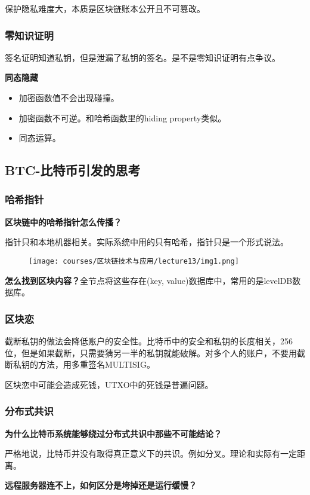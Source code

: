 \documentclass[10pt]{ctexart}
\begin{document}
保护隐私难度大，本质是区块链账本公开且不可篡改。

\subsubsection{零知识证明}
签名证明知道私钥，但是泄漏了私钥的签名。是不是零知识证明有点争议。

\textbf{同态隐藏}
\begin{itemize}
    \item 加密函数值不会出现碰撞。
    \item 加密函数不可逆。和哈希函数里的hiding property类似。
    \item 同态运算。
\end{itemize}
 
\subsection{BTC-比特币引发的思考}
\subsubsection{哈希指针}
\textbf{区块链中的哈希指针怎么传播？}

指针只和本地机器相关。实际系统中用的只有哈希，指针只是一个形式说法。
\begin{figure}[H]
    \centering
    \texttt{[image: courses/区块链技术与应用/lecture13/img1.png]} 
\end{figure}
 
\textbf{怎么找到区块内容？}全节点将这些存在(key, value)数据库中，常用的是levelDB数据库。

\subsubsection{区块恋}
截断私钥的做法会降低账户的安全性。比特币中的安全和私钥的长度相关，256位，但是如果截断，只需要猜另一半的私钥就能破解。对多个人的账户，不要用截断私钥的方法，用多重签名MULTISIG。

区块恋中可能会造成死钱，UTXO中的死钱是普遍问题。
\subsubsection{分布式共识}
\textbf{为什么比特币系统能够绕过分布式共识中那些不可能结论？}

严格地说，比特币并没有取得真正意义下的共识。例如分叉。理论和实际有一定距离。

\textbf{远程服务器连不上，如何区分是垮掉还是运行缓慢？}
\end{document}
